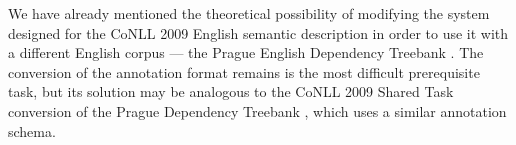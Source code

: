 \documentclass[12pt,notitlepage]{report}
\begin{document}
We have already mentioned the theoretical possibility of modifying the system designed for the CoNLL 2009 English semantic description in order to use it with a different English corpus --- the Prague English Dependency Treebank \cite{cinkova09}. The conversion of the annotation format remains is the most difficult prerequisite task, but its solution may be analogous to the CoNLL 2009 Shared Task conversion of the Prague Dependency Treebank \citep{hajic06,hajic09}, which uses a similar annotation schema.

\cleardoublepage
{}
\printnomenclature[2cm]
\cleardoublepage


\end{document}
